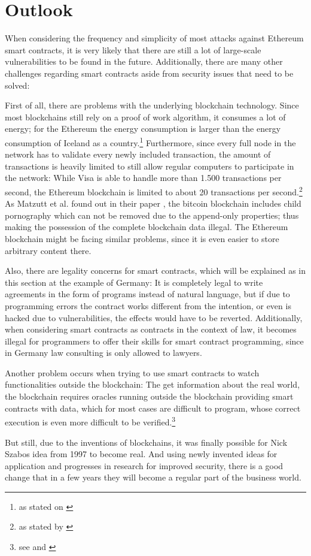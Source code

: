 \section{Outlook}
When considering the frequency and simplicity of most attacks against Ethereum smart contracts, it is very likely that there are still a lot of large-scale vulnerabilities to be found in the future. Additionally, there are many other challenges regarding smart contracts aside from security issues that need to be solved:

First of all, there are problems with the underlying blockchain technology. Since most blockchains still rely on a proof of work algorithm, it consumes a lot of energy; for the Ethereum the energy consumption is larger than the energy consumption of Iceland as a country.\footnote{as stated on \cite{digiconomist:ethereumenergy}} Furthermore, since every full node in the network has to validate every newly included transaction, the amount of transactions is heavily limited to still allow regular computers to participate in the network: While Visa is able to handle more than 1.500 transactions per second, the Ethereum blockchain is limited to about 20 transactions per second.\footnote{as stated by \cite{altcointoday:paypalvsethereum}} As Matzutt et al. found out in their paper \cite{matzutt:arbitraryblockchaincontent}, the bitcoin blockchain includes child pornography which can not be removed due to the append-only properties; thus making the possession of the complete blockchain data illegal. The Ethereum blockchain might be facing similar problems, since it is even easier to store arbitrary content there.

Also, there are legality concerns for smart contracts, which will be explained as in this section at the example of Germany: It is completely legal to write agreements in the form of programs instead of natural language, but if due to programming errors the contract works different from the intention, or even is hacked due to vulnerabilities, the effects would have to be reverted. Additionally, when considering smart contracts as contracts in the context of law, it becomes illegal for programmers to offer their skills for smart contract programming, since in Germany law consulting is only allowed to lawyers.

Another problem occurs when trying to use smart contracts to watch functionalities outside the blockchain: The get information about the real world, the blockchain requires oracles running outside the blockchain providing smart contracts with data, which for most cases are difficult to program, whose correct execution is even more difficult to be verified.\footnote{see \cite{ct:smartcontracts} and \cite[page 17]{vbwbayern:blockchain}}

But still, due to the inventions of blockchains, it was finally possible for Nick Szabos idea from 1997 to become real. And using newly invented ideas for application and progresses in research for improved security, there is a good change that in a few years they will become a regular part of the business world.

\pagebreak{}
